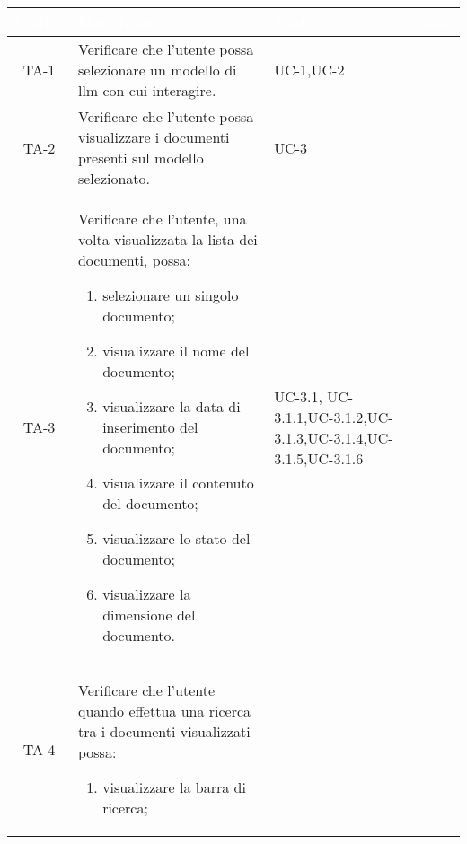\begingroup
\setlength{\tabcolsep}{10pt}
\renewcommand{\arraystretch}{1.5}
\begin{xltabular}{\textwidth}{| c | X | X | c |}
    \hline
     \textbf{\textcolor{white}{Codice}} & \textbf{\textcolor{white}{Descrizione}} & \textbf{\textcolor{white}{Fonte}} & \textbf{\textcolor{white}{Stato}}\\
    \hline
    \endhead
    \hline
    
    TA-1 & Verificare che l’utente possa selezionare un modello di llm con cui interagire. & UC-1,\newline UC-2 & \textcolor{xmarkcolor}{}  \\
    \hline
    TA-2 & Verificare che l’utente possa visualizzare i documenti presenti sul modello selezionato.
     & UC-3 &\textcolor{xmarkcolor}{}  \\
    \hline
    TA-3 & Verificare che l’utente, una volta visualizzata la lista dei documenti, possa: \begin{enumerate}
        \item selezionare un singolo documento;
        \item visualizzare il nome del documento;
        \item visualizzare la data di inserimento del documento;
        \item visualizzare il contenuto del documento;
        \item visualizzare lo stato del documento;
        \item visualizzare la dimensione del documento.
    \end{enumerate} & UC-3.1, \newline UC-3.1.1,\newline UC-3.1.2,\newline UC-3.1.3,\newline UC-3.1.4,\newline UC-3.1.5,\newline UC-3.1.6 & \textcolor{xmarkcolor}{}  \\
    \hline
    TA-4 & Verificare che l’utente quando effettua una ricerca tra i documenti visualizzati possa:
    \begin{enumerate}
        \item visualizzare la barra di ricerca;

\end{enumerate}
\end{xltabular}
